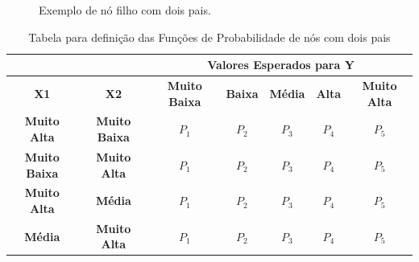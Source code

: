 \begin{figure}[ht!]
\begin{center}
	\end{center}
	\caption{Exemplo de nó filho com dois pais.}
	\label{funcoes:bn1}
\end{figure}

\begin{table}[ht!]
\centering
\caption{Tabela para definição das Funções de Probabilidade de nós com dois pais}
\label{funcoes:2nos}
\begin{tabular}{|c|c|c|c|c|c|c|}
\hline
\multicolumn{2}{|l|}{}                      & \multicolumn{5}{c|}{\textbf{Valores Esperados para Y}}                                       \\ \hline
\textbf{X1}          & \textbf{X2}          & \textbf{Muito Baixa} & \textbf{Baixa} & \textbf{Média} & \textbf{Alta} & \textbf{Muito Alta} \\ \hline
\textbf{Muito Alta}  & \textbf{Muito Baixa} & $P_{1}$              & $P_{2}$        & $P_{3}$        & $P_{4}$       & $P_{5}$              \\ \hline
\textbf{Muito Baixa} & \textbf{Muito Alta}  & $P_{1}$              & $P_{2}$        & $P_{3}$        & $P_{4}$       & $P_{5}$             \\ \hline
\textbf{Muito Alta}  & \textbf{Média}       & $P_{1}$              & $P_{2}$        & $P_{3}$        & $P_{4}$       & $P_{5}$             \\ \hline
\textbf{Média}       & \textbf{Muito Alta}  & $P_{1}$              & $P_{2}$        & $P_{3}$        & $P_{4}$       & $P_{5}$             \\ \hline
\end{tabular}
\end{table}


